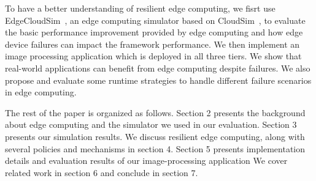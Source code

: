 To have a better understanding of resilient edge computing, we fisrt use EdgeCloudSim~\cite{edgecloudsim},
an edge computing simulator based on CloudSim~\cite{cloudsim},
to evaluate the basic performance improvement provided by edge computing and how edge device failures can impact
the framework performance. We then implement an image processing application which is
deployed in all three tiers. We show that real-world applications can benefit from edge computing
despite failures. We also propose and evaluate some runtime strategies to handle different
failure scenarios in edge computing.

The rest of the paper is organized as follows. Section 2 presents the background about
edge computing and the simulator we used in our evaluation. Section 3 presents our simulation results.
We discuss resilient edge computing, along with several policies and mechanisms in section 4.
Section 5 presents implementation details and evaluation results of our image-processing application
We cover related work in section 6 and conclude in section 7.
